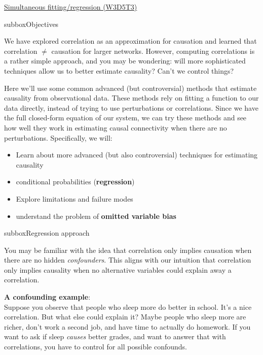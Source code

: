 \begin{textbox}{\href{https://compneuro.neuromatch.io/tutorials/W3D5_NetworkCausality/student/W3D5_Tutorial3.html}{Simultaneous fitting/regression (W3D5T3)}   }

\begin{subbox}{subbox}{Objectives}
\scriptsize


We have explored correlation as an approximation for causation and learned that correlation $\neq$ causation for larger networks. However, computing correlations is a rather simple approach, and you may be wondering: will more sophisticated techniques allow us to better estimate causality? Can't we control things? 

Here we'll use some common advanced (but controversial) methods that estimate causality from observational data. These methods rely on fitting a function to our data directly, instead of trying to use perturbations or correlations. Since we have the full closed-form equation of our system, we can try these methods and see how well they work in estimating causal connectivity when there are no perturbations. Specifically, we will:

\begin{itemize}
    \item  Learn about more advanced (but also controversial) techniques for estimating causality
    \item conditional probabilities (\textbf{regression})
\item Explore limitations and failure modes
    \item  understand the problem of \textbf{omitted variable bias}
\end{itemize}

\end{subbox}

\begin{subbox}{subbox}{Regression approach}
\scriptsize

You may be familiar with the idea that correlation only implies causation when there are no hidden \textit{confounders}. This aligns with our intuition that correlation only implies causality when no alternative variables could explain away a correlation.

\textbf{A confounding example}:\\
Suppose you observe that people who sleep more do better in school. It's a nice correlation. But what else could explain it? Maybe people who sleep more are richer, don't work a second job, and have time to actually do homework. If you want to ask if sleep \textit{causes} better grades, and want to answer that with correlations, you have to control for all possible confounds.\\


\end{subbox}
\end{textbox}
